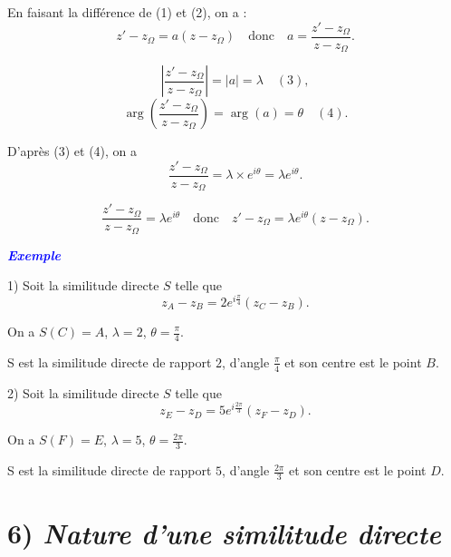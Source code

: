 \documentclass[12pt,a4paper]{article}
\begin{document}
En faisant la différence de (1) et (2), on a : 
\[
z' - z_{\Omega} = a( z - z_{\Omega}) \quad \text{donc} \quad a = \frac{z' - z_{\Omega}}{z - z_{\Omega}}.
\]

\[
\left| \frac{z' - z_{\Omega}}{z - z_{\Omega}} \right| = |a| = \lambda \quad (3),
\]
\[
\arg \left( \frac{z' - z_{\Omega}}{z - z_{\Omega}} \right) = \arg(a) = \theta \quad (4).
\]

D’après (3) et (4), on a 
\[
\frac{z' - z_{\Omega}}{z - z_{\Omega}} = \lambda \times e^{i\theta} = \lambda e^{i\theta}.
\]

\[
\frac{z' - z_{\Omega}}{z - z_{\Omega}} = \lambda e^{i\theta} \quad \text{donc} \quad z' - z_{\Omega} = \lambda e^{i\theta} (z - z_{\Omega}).
\]

\textbf{\textcolor{blue}{\textit{Exemple}}}

\vspace{0.3cm}

1) Soit la similitude directe \( S \) telle que 
\[
z_A - z_B = 2 e^{i \frac{\pi}{4}} (z_C - z_B).
\]

On a \quad \( S(C) = A \), \quad \( \lambda = 2 \), \quad \( \theta = \frac{\pi}{4} \).

S est la similitude directe de rapport \( 2 \), d’angle \( \frac{\pi}{4} \) et son centre est le point \( B \).

\vspace{0.5cm}

2) Soit la similitude directe \( S \) telle que 
\[
z_E - z_D = 5 e^{i \frac{2\pi}{3}} (z_F - z_D).
\]

On a \quad \( S(F) = E \), \quad \( \lambda = 5 \), \quad \( \theta = \frac{2\pi}{3} \).

S est la similitude directe de rapport \( 5 \), d’angle \( \frac{2\pi}{3} \) et son centre est le point \( D \).


\vspace{0.5cm}

\section*{6) \textit{Nature d’une similitude directe}}
\end{document}
